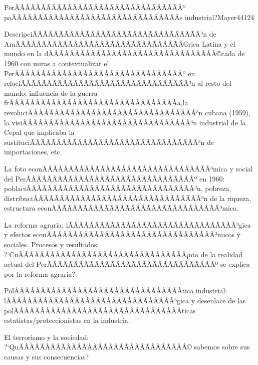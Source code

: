 \begin{syllabus}
\begin{unit}{PerÃÂÃÂÃÂÃÂÃÂÃÂÃÂÃÂÃÂÃÂÃÂÃÂÃÂÃÂÃÂÃÂº paÃÂÃÂÃÂÃÂÃÂÃÂÃÂÃÂÃÂÃÂÃÂÃÂÃÂÃÂÃÂÃÂ­s industrial?}{}{Mayer44}{12}{4}
   \begin{topics}
      \item DescripciÃÂÃÂÃÂÃÂÃÂÃÂÃÂÃÂÃÂÃÂÃÂÃÂÃÂÃÂÃÂÃÂ³n de AmÃÂÃÂÃÂÃÂÃÂÃÂÃÂÃÂÃÂÃÂÃÂÃÂÃÂÃÂÃÂÃÂ©rica Latina y el mundo en la dÃÂÃÂÃÂÃÂÃÂÃÂÃÂÃÂÃÂÃÂÃÂÃÂÃÂÃÂÃÂÃÂ©cada de 1960 con miras a contextualizar el PerÃÂÃÂÃÂÃÂÃÂÃÂÃÂÃÂÃÂÃÂÃÂÃÂÃÂÃÂÃÂÃÂº en relaciÃÂÃÂÃÂÃÂÃÂÃÂÃÂÃÂÃÂÃÂÃÂÃÂÃÂÃÂÃÂÃÂ³n al resto del mundo: influencia de la guerra frÃÂÃÂÃÂÃÂÃÂÃÂÃÂÃÂÃÂÃÂÃÂÃÂÃÂÃÂÃÂÃÂ­a,la revoluciÃÂÃÂÃÂÃÂÃÂÃÂÃÂÃÂÃÂÃÂÃÂÃÂÃÂÃÂÃÂÃÂ³n cubana (1959), la visiÃÂÃÂÃÂÃÂÃÂÃÂÃÂÃÂÃÂÃÂÃÂÃÂÃÂÃÂÃÂÃÂ³n industrial de la Cepal que implicaba la sustituciÃÂÃÂÃÂÃÂÃÂÃÂÃÂÃÂÃÂÃÂÃÂÃÂÃÂÃÂÃÂÃÂ³n de importaciones, etc.
      \item La foto econÃÂÃÂÃÂÃÂÃÂÃÂÃÂÃÂÃÂÃÂÃÂÃÂÃÂÃÂÃÂÃÂ³mica y social del PerÃÂÃÂÃÂÃÂÃÂÃÂÃÂÃÂÃÂÃÂÃÂÃÂÃÂÃÂÃÂÃÂº en 1960: poblaciÃÂÃÂÃÂÃÂÃÂÃÂÃÂÃÂÃÂÃÂÃÂÃÂÃÂÃÂÃÂÃÂ³n, pobreza, distribuciÃÂÃÂÃÂÃÂÃÂÃÂÃÂÃÂÃÂÃÂÃÂÃÂÃÂÃÂÃÂÃÂ³n de la riqueza, estructura econÃÂÃÂÃÂÃÂÃÂÃÂÃÂÃÂÃÂÃÂÃÂÃÂÃÂÃÂÃÂÃÂ³mica.
      \item La reforma agraria: lÃÂÃÂÃÂÃÂÃÂÃÂÃÂÃÂÃÂÃÂÃÂÃÂÃÂÃÂÃÂÃÂ³gica y efectos econÃÂÃÂÃÂÃÂÃÂÃÂÃÂÃÂÃÂÃÂÃÂÃÂÃÂÃÂÃÂÃÂ³micos y sociales. Procesos y resultados. ?`CuÃÂÃÂÃÂÃÂÃÂÃÂÃÂÃÂÃÂÃÂÃÂÃÂÃÂÃÂÃÂÃÂ¡nto de la realidad actual del PerÃÂÃÂÃÂÃÂÃÂÃÂÃÂÃÂÃÂÃÂÃÂÃÂÃÂÃÂÃÂÃÂº se explica por la reforma agraria?
      \item PolÃÂÃÂÃÂÃÂÃÂÃÂÃÂÃÂÃÂÃÂÃÂÃÂÃÂÃÂÃÂÃÂ­tica industrial: lÃÂÃÂÃÂÃÂÃÂÃÂÃÂÃÂÃÂÃÂÃÂÃÂÃÂÃÂÃÂÃÂ³gica y desenlace de las polÃÂÃÂÃÂÃÂÃÂÃÂÃÂÃÂÃÂÃÂÃÂÃÂÃÂÃÂÃÂÃÂ­ticas estatistas/proteccionistas en la industria.
      \item El terrorismo y la sociedad: ?`QuÃÂÃÂÃÂÃÂÃÂÃÂÃÂÃÂÃÂÃÂÃÂÃÂÃÂÃÂÃÂÃÂ© sabemos sobre sus causas y sus consecuencias?

\end{topics}
\end{unit}
\end{syllabus}
